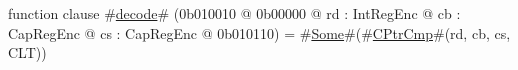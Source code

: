 function clause #\hyperref[zdecode]{decode}# (0b010010 @ 0b00000 @ rd : IntRegEnc @ cb : CapRegEnc @ cs : CapRegEnc @ 0b010110) = #\hyperref[zSome]{Some}#(#\hyperref[zCPtrCmp]{CPtrCmp}#(rd, cb, cs, CLT))
